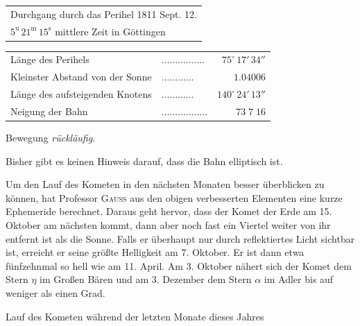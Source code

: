 \begin{center}\fontsize{10}{12}\selectfont\setlength{\tabcolsep}{4pt}\renewcommand{\arraystretch}{1.15}\begin{tabular}{l}
Durchgang durch das Perihel 1811 Sept. 12.\\
\quad $5^{\mathrm u}\,21^{\mathrm m}\,15^{\mathrm s}$ mittlere Zeit in Göttingen\\
\end{tabular}\end{center}
\begin{center}\fontsize{9}{11}\selectfont\setlength{\tabcolsep}{2pt}\renewcommand{\arraystretch}{1.15}\begin{tabular}{llr}
Länge des Perihels & .\;.\;.\;.\;.\;.\;.\;.\;.\;.\;.\;.\;.\;.\;.\;. & $75^\circ\,17'\,34''$\\
Kleinster Abstand von der Sonne & .\;.\;.\;.\;.\;.\;.\;.\;.\;.\;.\;. & $1.04006$\\
Länge des aufsteigenden Knotens & .\;.\;.\;.\;.\;.\;.\;.\;.\;.\;.\;. & $140^\circ\,24'\,13''$\\
Neigung der Bahn & .\;.\;.\;.\;.\;.\;.\;.\;.\;.\;.\;.\;.\;.\;.\;.\;. & $73\;7\;16$\\
\end{tabular}\end{center}
\noindent Bewegung \emph{rückläufig}.

\par\indent Bisher gibt es keinen Hinweis darauf, dass die Bahn elliptisch ist.

\par\indent Um den Lauf des Kometen in den nächsten Monaten besser überblicken zu können, hat Professor \textsc{Gauss} aus den obigen verbesserten Elementen eine kurze Ephemeride berechnet. Daraus geht hervor, dass der Komet der Erde am 15. Oktober am nächsten kommt, dann aber noch fast ein Viertel weiter von ihr entfernt ist als die Sonne. Falls er überhaupt nur durch reflektiertes Licht sichtbar ist, erreicht er seine größte Helligkeit am 7. Oktober. Er ist dann etwa fünfzehnmal so hell wie am 11. April. Am 3. Oktober nähert sich der Komet dem Stern $\eta$ im Großen Bären und am 3. Dezember dem Stern $\alpha$ im Adler bis auf weniger als einen Grad.

\noindent Lauf des Kometen während der letzten Monate dieses Jahres

